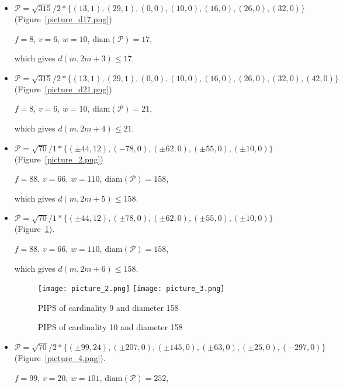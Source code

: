 \documentclass[12pt]{article}
\theoremstyle{theorem}
\theoremstyle{dfn}
\theoremstyle{remark}
\begin{document}
\begin{itemize}
\setlength{\itemsep}{-1mm}

\item
$\mathcal{P}=\sqrt{315}/{2} * \{ (13, 1),
(29, 1),
(0, 0),
(10, 0),
(16, 0),
(26, 0),
(32, 0)\}
$
(Figure~\ref{picture_d17.png})

$f = 8$, $v = 6$, $w = 10$, $\operatorname{diam(\mathcal{P})} = 17$,

which gives $d(m, 2m + 3) \leq 17$.


\item
$\mathcal{P}=\sqrt{315}/{2} * \{ (13, 1),
(29, 1),
(0, 0),
(10, 0),
(16, 0),
(26, 0),
(32, 0),
(42, 0)\}
$
(Figure~\ref{picture_d21.png})

$f = 8$, $v = 6$, $w = 10$, $\operatorname{diam(\mathcal{P})} = 21$,

which gives $d(m, 2m + 4) \leq 21$.


\item
$\mathcal{P}=\sqrt{70}/{1} * \{ (\pm 44, 12),
(-78 , 0),
(\pm 62, 0),
(\pm 55 , 0),
(\pm 10 , 0)\}
$
(Figure~\ref{picture_2.png})

$f = 88$, $v = 66$, $w = 110$, $\operatorname{diam(\mathcal{P})} = 158$,

which gives $d(m, 2m + 5) \leq 158$.


\item
$\mathcal{P}=\sqrt{70}/{1} * \{ (\pm 44, 12),
(\pm 78 , 0),
(\pm 62, 0),
(\pm 55 , 0),
(\pm 10 , 0)\}
$
(Figure~\ref{picture_3.png}).

$f = 88$, $v = 66$, $w = 110$, $\operatorname{diam(\mathcal{P})} = 158$,

which gives $d(m, 2m + 6) \leq 158$.


\begin{figure}[h!]
	\texttt{[image: picture\_2.png]}
	\hfill
	\texttt{[image: picture\_3.png]}
	\\
	\parbox{.48\linewidth}{\caption{PIPS of cardinality 9 and diameter 158}
	\label{picture_2.png}}
	\hfill
	\parbox{.48\linewidth}{\caption{PIPS of cardinality 10 and diameter 158}
	\label{picture_3.png}}
\end{figure}


\item
$\mathcal{P}=\sqrt{70}/{2} * \{ (\pm 99, 24),
(\pm 207 , 0),
(\pm 145 , 0),
(\pm 63 , 0),
(\pm 25 , 0),
(-297 , 0)\}
$
(Figure~\ref{picture_4.png}).

$f = 99$, $v = 20$, $w = 101$, $\operatorname{diam(\mathcal{P})} = 252$,


\end{itemize}
\end{document}
